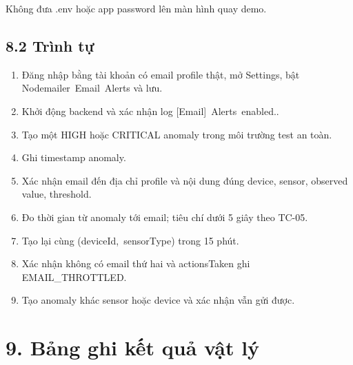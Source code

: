 \documentclass[11pt,oneside,openany]{book}
\renewcommand{\texttt}[1]{{\ttfamily\small #1}}
\providecommand{\tightlist}{\setlength{\itemsep}{1pt}\setlength{\parskip}{0pt}}
\begin{document}
Không đưa \texttt{.env} hoặc app password lên màn hình quay demo.

\subsection{8.2 Trình tự}\label{82-truxecnh-tux1ef1}

\begin{enumerate}
\def\labelenumi{\arabic{enumi}.}
\tightlist
\item
  Đăng nhập bằng tài khoản có email profile thật, mở Settings, bật
  \texttt{Nodemailer\ Email\ Alerts} và lưu.
\item
  Khởi động backend và xác nhận log
  \texttt{{[}Email{]}\ Alerts\ enabled.}.
\item
  Tạo một HIGH hoặc CRITICAL anomaly trong môi trường test an toàn.
\item
  Ghi timestamp anomaly.
\item
  Xác nhận email đến địa chỉ profile và nội dung đúng device, sensor,
  observed value, threshold.
\item
  Đo thời gian từ anomaly tới email; tiêu chí dưới 5 giây theo TC-05.
\item
  Tạo lại cùng \texttt{(deviceId,\ sensorType)} trong 15 phút.
\item
  Xác nhận không có email thứ hai và \texttt{actionsTaken} ghi
  \texttt{EMAIL\_THROTTLED}.
\item
  Tạo anomaly khác sensor hoặc device và xác nhận vẫn gửi được.
\end{enumerate}

\section{9. Bảng ghi kết quả vật
lý}\label{9-bux1ea3ng-ghi-kux1ebft-quux1ea3-vux1eadt-luxfd}
\end{document}
